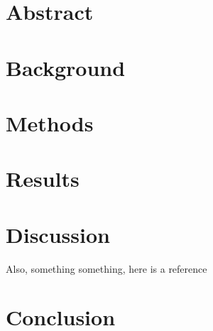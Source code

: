 \documentclass{article}
\begin{document}


\begin{multicols}{2}

\section*{Abstract}

\textbf{ \textit {  }}

\section*{Background}

\lipsum[77]

\section*{Methods}

\lipsum[100]

\section*{Results}

\lipsum[100]

\section*{Discussion}

\lipsum[66]

Also, something something, here is a reference~\cite{mell_nist_nodate}

\section*{Conclusion}

\lipsum[100]

\printbibliography

\end{multicols}
\end{document}
